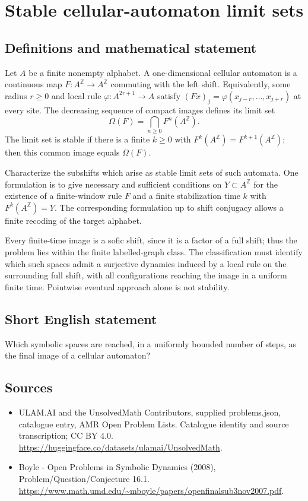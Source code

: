 \documentclass[11pt,a4paper]{article}
\begin{document}
\section*{Stable cellular-automaton limit sets}\label{statement}

\subsection{Definitions and mathematical statement}
Let $A$ be a finite nonempty alphabet. A one-dimensional cellular
automaton is a continuous map $F:A^{\mathbb Z}\to A^{\mathbb Z}$
commuting with the left shift. Equivalently, some radius $r\ge0$ and
local rule $\varphi:A^{2r+1}\to A$ satisfy
$(Fx)_j=\varphi(x_{j-r},\ldots,x_{j+r})$ at every site.
The decreasing sequence of compact images defines its limit set
\[
       \Omega(F)=\bigcap_{n\ge0}F^n(A^{\mathbb Z}).
\]
The limit set is stable if there is a finite $k\ge0$ with
$F^k(A^{\mathbb Z})=F^{k+1}(A^{\mathbb Z})$; then this common image
equals $\Omega(F)$.

Characterize the subshifts which arise as stable limit sets of such
automata. One formulation is to give necessary and sufficient conditions
on $Y\subset A^{\mathbb Z}$ for the existence of a finite-window rule
$F$ and a finite stabilization time $k$ with $F^k(A^{\mathbb Z})=Y$.
The corresponding formulation up to shift conjugacy allows a finite
recoding of the target alphabet.

Every finite-time image is a sofic shift, since it is a factor of a
full shift; thus the problem lies within the finite labelled-graph
class. The classification must identify which such spaces admit a
surjective dynamics induced by a local rule on the surrounding full
shift, with all configurations reaching the image in a uniform finite
time. Pointwise eventual approach alone is not stability.
\subsection{Short English statement}
Which symbolic spaces are reached, in a uniformly bounded number of steps, as the final image of a cellular automaton?
\subsection{Sources}
\begin{itemize}
\item[S1] ULAM.AI and the UnsolvedMath Contributors, supplied problems.json, catalogue entry, AMR Open Problem Lists. Catalogue identity and source transcription; CC BY 4.0.
\url{https://huggingface.co/datasets/ulamai/UnsolvedMath}.
\item[S2] Boyle - Open Problems in Symbolic Dynamics (2008), Problem/Question/Conjecture 16.1. 
\url{https://www.math.umd.edu/~mboyle/papers/openfinalsub3nov2007.pdf}.
\end{itemize}
\end{document}
